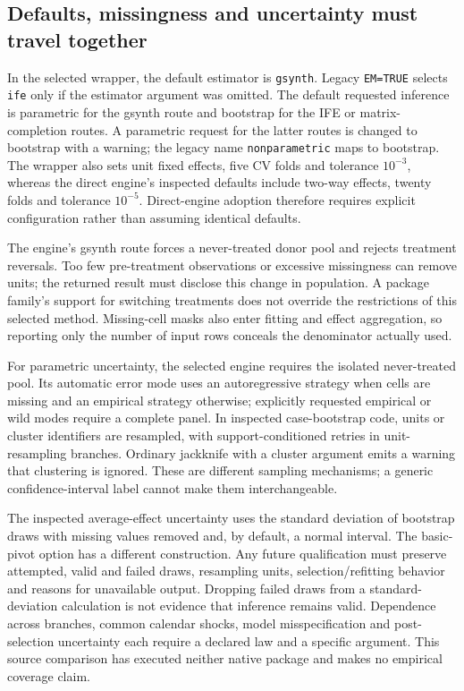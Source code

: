 \subsection{Defaults, missingness and uncertainty must travel together}
\label{exec21:gsynth-inference}

In the selected wrapper, the default estimator is \texttt{gsynth}. Legacy
\texttt{EM=TRUE} selects \texttt{ife} only if the estimator argument was
omitted. The default requested inference is parametric for the gsynth route
and bootstrap for the IFE or matrix-completion routes. A parametric request
for the latter routes is changed to bootstrap with a warning; the legacy
name \texttt{nonparametric} maps to bootstrap. The wrapper also sets unit
fixed effects, five CV folds and tolerance $10^{-3}$, whereas the direct
engine's inspected defaults include two-way effects, twenty folds and
tolerance $10^{-5}$. Direct-engine adoption therefore requires explicit
configuration rather than assuming identical defaults.
\citep{exec21_gsynth_wrapper,exec21_gsynth_engine}

The engine's gsynth route forces a never-treated donor pool and rejects
treatment reversals. Too few pre-treatment observations or excessive
missingness can remove units; the returned result must disclose this change
in population. A package family's support for switching treatments does not
override the restrictions of this selected method. Missing-cell masks also
enter fitting and effect aggregation, so reporting only the number of
input rows conceals the denominator actually used. \citep{exec21_gsynth_engine}

For parametric uncertainty, the selected engine requires the isolated
never-treated pool. Its automatic error mode uses an autoregressive strategy
when cells are missing and an empirical strategy otherwise; explicitly
requested empirical or wild modes require a complete panel. In inspected
case-bootstrap code, units or cluster identifiers are resampled, with
support-conditioned retries in unit-resampling branches. Ordinary jackknife
with a cluster argument emits a warning that clustering is ignored. These
are different sampling mechanisms; a generic confidence-interval label
cannot make them interchangeable. \citep{exec21_gsynth_engine}

The inspected average-effect uncertainty uses the standard deviation of
bootstrap draws with missing values removed and, by default, a normal
interval. The basic-pivot option has a different construction. Any future
qualification must preserve attempted, valid and failed draws, resampling
units, selection/refitting behavior and reasons for unavailable output.
Dropping failed draws from a standard-deviation calculation is not evidence
that inference remains valid. Dependence across branches, common calendar
shocks, model misspecification and post-selection uncertainty each require a
declared law and a specific argument. This source comparison has executed
neither native package and makes no empirical coverage claim.
\citep{exec21_gsynth_engine}

